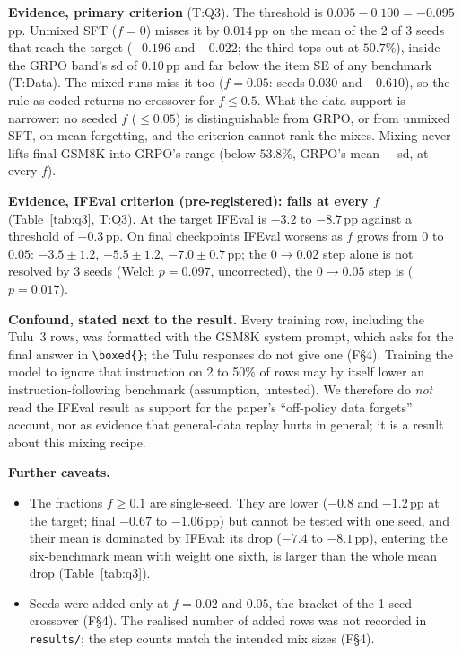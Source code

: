 \documentclass[11pt]{article}
\newcommand{\pp}{\,pp\xspace}
\newcommand{\T}[1]{\textsf{T:#1}}
\newcommand{\F}[1]{\textsf{F\S#1}}
\begin{document}
\textbf{Evidence, primary criterion} (\T{Q3}). The threshold is $0.005 - 0.100 = -0.095$\pp. Unmixed SFT ($f = 0$)
misses it by $0.014$\pp on the mean of the 2 of 3 seeds that reach the target ($-0.196$ and $-0.022$; the third tops out at $50.7$\%), inside the GRPO
band's sd of $0.10$\pp and far below the item SE of any benchmark (\T{Data}). The mixed runs miss it too ($f = 0.05$:
seeds $0.030$ and $-0.610$), so the rule as coded returns no crossover for $f \le 0.5$. What the data support is
narrower: no seeded $f$ ($\le 0.05$) is distinguishable from GRPO, or from unmixed SFT, on mean forgetting, and the
criterion cannot rank the mixes. Mixing never lifts final GSM8K into GRPO's range (below $53.8$\%, GRPO's mean $-$ sd,
at every $f$).

\textbf{Evidence, IFEval criterion (pre-registered): fails at every $f$} (Table~\ref{tab:q3}, \T{Q3}). At the target
IFEval is $-3.2$ to $-8.7$\pp against a threshold of $-0.3$\pp. On final checkpoints IFEval worsens as $f$ grows from
0 to $0.05$: $-3.5 \pm 1.2$, $-5.5 \pm 1.2$, $-7.0 \pm 0.7$\pp; the $0 \to 0.02$ step alone is not resolved by 3 seeds
(Welch $p = 0.097$, uncorrected), the $0 \to 0.05$ step is ($p = 0.017$).

\textbf{Confound, stated next to the result.} Every training row, including the Tulu~3 rows, was formatted with the
GSM8K system prompt, which asks for the final answer in \verb|\boxed{}|; the Tulu responses do not give one (\F{4}).
Training the model to ignore that instruction on 2 to 50\% of rows may by itself lower an instruction-following
benchmark (assumption, untested). We therefore do \emph{not} read the IFEval result as support for the paper's
``off-policy data forgets'' account, nor as evidence that general-data replay hurts in general; it is a result about
this mixing recipe.

\textbf{Further caveats.}
\begin{itemize}
\item The fractions $f \ge 0.1$ are single-seed. They are lower ($-0.8$ and $-1.2$\pp at the target; final $-0.67$ to
  $-1.06$\pp) but cannot be tested with one seed, and their mean is dominated by IFEval: its drop ($-7.4$ to
  $-8.1$\pp), entering the six-benchmark mean with weight one sixth, is larger than the whole mean drop
  (Table~\ref{tab:q3}).
\item Seeds were added only at $f = 0.02$ and $0.05$, the bracket of the 1-seed crossover (\F{4}). The realised number
  of added rows was not recorded in \texttt{results/}; the step counts match the intended mix sizes (\F{4}).
\end{itemize}
\end{document}
